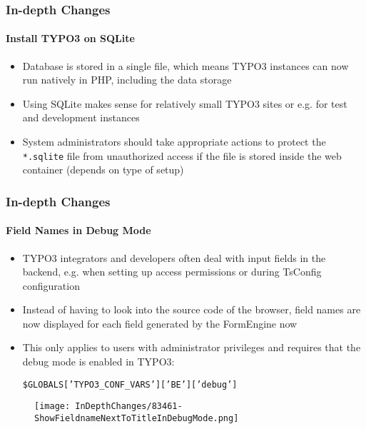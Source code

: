 \begin{frame}[fragile]
	\frametitle{In-depth Changes}
	\framesubtitle{Install TYPO3 on SQLite}

	\begin{itemize}
		\item Database is stored in a single file, which means TYPO3 instances
			can now run natively in PHP, including the data storage
		\item Using SQLite makes sense for relatively small TYPO3 sites
			or e.g. for test and development instances
		\item System administrators should take appropriate actions to protect
			the \texttt{*.sqlite} file from unauthorized access if the file
			is stored inside the web container (depends on type of setup)
	\end{itemize}

\end{frame}


\begin{frame}[fragile]
	\frametitle{In-depth Changes}
	\framesubtitle{Field Names in Debug Mode}

	\begin{itemize}

		\item TYPO3 integrators and developers often deal with input fields in the backend,
			e.g. when setting up access permissions or during TsConfig configuration

		\item Instead of having to look into the source code of the browser,
			field names are now displayed for each field generated by the
			FormEngine now

		\item This only applies to users with administrator privileges and
			requires that the debug mode is enabled in TYPO3:

			\smaller
				\texttt{\$GLOBALS['TYPO3\_CONF\_VARS']['BE']['debug']}
			\normalsize

	\end{itemize}

	\begin{figure}
		\texttt{[image: InDepthChanges/83461-ShowFieldnameNextToTitleInDebugMode.png]}
	\end{figure}

\end{frame}

